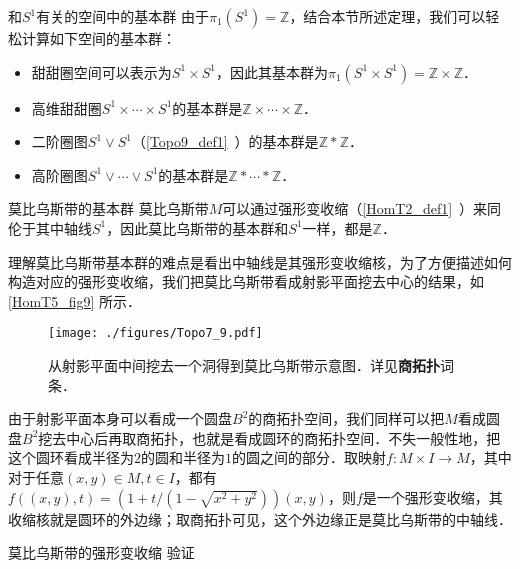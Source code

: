 \begin{example}{和$S^1$有关的空间中的基本群}
由于$\pi_1(S^1)=\mathbb{Z}$，结合本节所述定理，我们可以轻松计算如下空间的基本群：
\begin{itemize}
\item 甜甜圈空间可以表示为$S^1\times S^1$，因此其基本群为$\pi_1(S^1\times S^1)=\mathbb{Z}\times\mathbb{Z}$．
\item 高维甜甜圈$S^1\times\cdots\times S^1$的基本群是$\mathbb{Z}\times\cdots\times\mathbb{Z}$．
\item 二阶圈图$S^1\vee S^1$（\autoref{Topo9_def1}~）的基本群是$\mathbb{Z}*\mathbb{Z}$．
\item 高阶圈图$S^1\vee\cdots\vee S^1$的基本群是$\mathbb{Z}*\cdots*\mathbb{Z}$．
\end{itemize}

\end{example}

\begin{example}{莫比乌斯带的基本群}\label{HomT5_ex1}
莫比乌斯带$M$可以通过强形变收缩（\autoref{HomT2_def1}~）来同伦于其中轴线$S^1$，因此莫比乌斯带的基本群和$S^1$一样，都是$\mathbb{Z}$．

理解莫比乌斯带基本群的难点是看出中轴线是其强形变收缩核，为了方便描述如何构造对应的强形变收缩，我们把莫比乌斯带看成射影平面挖去中心的结果，如\autoref{HomT5_fig9} 所示．

\begin{figure}[ht]
\centering
\texttt{[image: ./figures/Topo7\_9.pdf]}
\caption{从射影平面中间挖去一个洞得到莫比乌斯带示意图．详见\textbf{商拓扑}词条．} \label{HomT5_fig9}
\end{figure}

由于射影平面本身可以看成一个圆盘$B^2$的商拓扑空间，我们同样可以把$M$看成圆盘$B^2$挖去中心后再取商拓扑，也就是看成圆环的商拓扑空间．不失一般性地，把这个圆环看成半径为$2$的圆和半径为$1$的圆之间的部分．取映射$f:M\times I\rightarrow M$，其中对于任意$(x, y)\in M, t\in I$，都有$f((x, y), t)= (1+t/(1-\sqrt{x^2+y^2}))(x, y)$，则$f$是一个强形变收缩，其收缩核就是圆环的外边缘；取商拓扑可见，这个外边缘正是莫比乌斯带的中轴线．
\end{example}

\begin{exercise}{莫比乌斯带的强形变收缩}
验证
\end{exercise}



